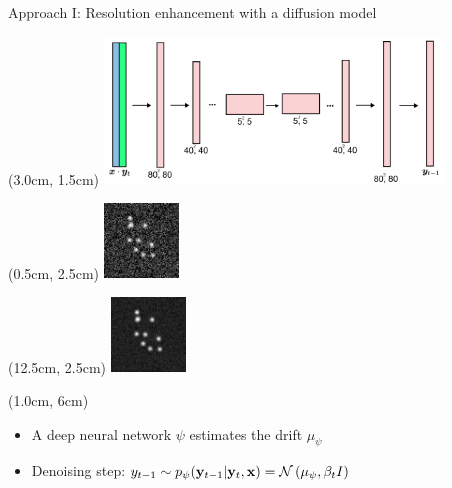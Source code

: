 \documentclass{beamer}					%
\begin{document}
\begin{frame}{Approach I: Resolution enhancement with a diffusion model}
\begin{textblock*}{9cm}(3.0cm, 1.5cm)
\includegraphics[width=9cm]{../../ddpm/ddpm/media/DiffusionArch.png}
\end{textblock*}
\begin{textblock*}{2cm}(0.5cm, 2.5cm)
\includegraphics[width=2cm]{../../dissertation/dissertation/media/diffusion_example/0_1_sr_79.png}
\end{textblock*}
\begin{textblock*}{2cm}(12.5cm, 2.5cm)
\includegraphics[width=2cm]{../../dissertation/dissertation/media/diffusion_example/0_1_sr_99.png}
\end{textblock*}

\begin{textblock*}{13cm}(1.0cm, 6cm)
\begin{itemize}
\item A deep neural network $\psi$ estimates the drift $\mu_{\psi}$
\item Denoising step: $y_{t-1}\sim p_{\psi}(\bold{y}_{t-1}|\bold{y}_{t},\bold{x}) = \mathcal{N}\left(\mu_{\psi},\beta_{t}I\right)$
\end{itemize}
\end{textblock*}
\end{frame}
\end{document}
